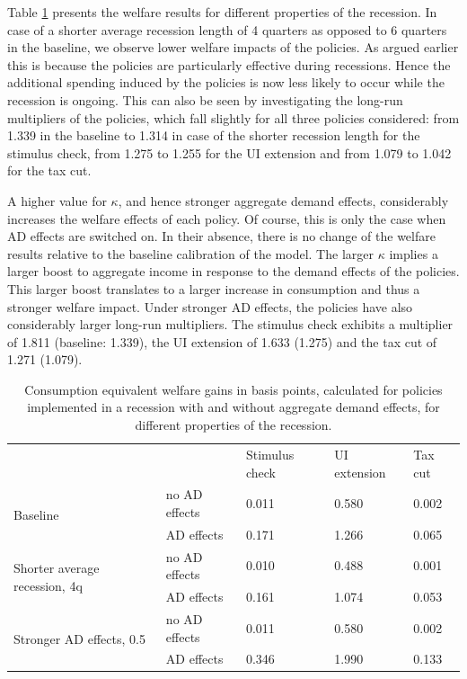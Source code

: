 \documentclass[../HAFiscal]{subfiles}
\begin{document}
Table \ref{tab:robustness_recession_property_results} presents the welfare results for different properties of the recession. In case of a shorter average recession length of 4 quarters as opposed to 6 quarters in the baseline, we observe lower welfare impacts of the policies. As argued earlier this is because the policies are particularly effective during recessions. Hence the additional spending induced by the policies is now less likely to occur while the recession is ongoing. This can also be seen by investigating the long-run multipliers of the policies, which fall slightly for all three policies considered: from 1.339 in the baseline to 1.314 in case of the shorter recession length for the stimulus check, from 1.275 to 1.255 for the UI extension and from 1.079 to 1.042 for the tax cut.

A higher value for $\kappa$, and hence stronger aggregate demand effects, considerably increases the welfare effects of each policy. Of course, this is only the case when AD effects are switched on. In their absence, there is no change of the welfare results relative to the baseline calibration of the model. The larger $\kappa$ implies a larger boost to aggregate income in response to the demand effects of the policies. This larger boost translates to a larger increase in consumption and thus a stronger welfare impact. Under stronger AD effects, the policies have also considerably larger long-run multipliers. The stimulus check exhibits a multiplier of 1.811 (baseline: 1.339), the UI extension of 1.633 (1.275) and the tax cut of 1.271 (1.079).


\begin{table}[]
	\begin{center}
		\begin{tabular}{@{}lllll@{}}
			\toprule
			&                    											& Stimulus check & UI extension & Tax cut 	\\ \cmidrule(l){1-5}
			\multirow{2}{*}{Baseline} 						& no AD effects & 0.011          & 0.580        & 0.002   	\\
			& AD effects    & 0.171          & 1.266        & 0.065   	\\ 
			\multirow{2}{*}{Shorter average recession, 4q}  & no AD effects & 0.010          & 0.488        & 0.001  	\\
			& AD effects    & 0.161          & 1.074        & 0.053   	\\
			\multirow{2}{*}{Stronger AD effects, 0.5}       & no AD effects & 0.011          & 0.580        & 0.002   	\\
			& AD effects    & 0.346          & 1.990        & 0.133   	\\ \cmidrule(l){1-5} 
		\end{tabular}
		\caption{Consumption equivalent welfare gains in basis points, calculated for policies implemented in a recession with and without aggregate demand effects, for different properties of the recession.}
		\label{tab:robustness_recession_property_results}
	\end{center}
\end{table}
\end{document}

